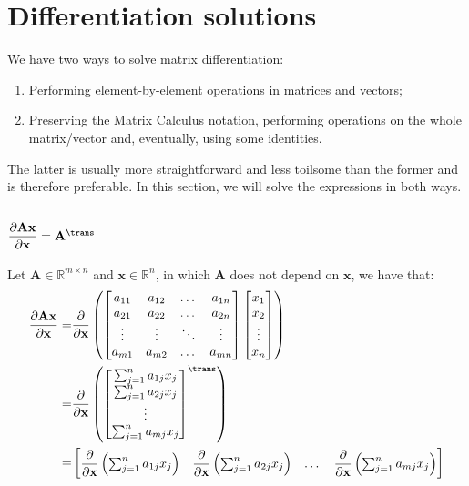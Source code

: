 \section{Differentiation solutions}\label{sec:diff}
We have two ways to solve matrix differentiation:
\begin{enumerate}
    \item Performing element-by-element operations in matrices and vectors;
    \item Preserving the Matrix Calculus notation, performing operations on the whole matrix/vector and, eventually, using some identities.
\end{enumerate}
The latter is usually more straightforward and less toilsome than the former and is therefore preferable. In this section, we will solve the expressions in both ways.

\subsection{\(\dfrac{\partial \mathbf{A} \mathbf{x}}{\partial \mathbf{x}} = \mathbf{A}^\trans\)}

Let \(\mathbf{A}\in \mathbb{R}^{m\times n}\) and \(\mathbf{x} \in \mathbb{R}^{n}\), in which \(\mathbf{A}\) does not depend on \(\mathbf{x}\), we have that:
\begin{align}
    \dfrac{\partial \mathbf{A} \mathbf{x}}{\partial \mathbf{x}} = & \dfrac{\partial}{\partial \mathbf{x}} \left(
        \begin{bmatrix}
            a_{11} & a_{12} & \dots & a_{1n} \\
            a_{21} & a_{22} & \dots & a_{2n} \\
            \vdots & \vdots & \ddots & \vdots \\
            a_{m1} & a_{m2} & \dots & a_{mn} \\
        \end{bmatrix} \begin{bmatrix}
            x_{1} \\ x_{2} \\ \vdots \\ x_{n}
        \end{bmatrix} \right)  \\
    = & \dfrac{\partial}{\partial \mathbf{x}} \left(\begin{bmatrix} 
        \sum_{j = 1}^n a_{1j}x_j \\
        \sum_{j = 1}^n a_{2j}x_j \\
        \vdots \\
        \sum_{j = 1}^n a_{mj}x_j
    \end{bmatrix}^\trans \right)  \\
    = & \begin{bmatrix}
        \dfrac{\partial}{\partial \mathbf{x}}\left(\sum_{j = 1}^n {a_{1j}x_j}\right) & \dfrac{\partial}{\partial \mathbf{x}}\left(\sum_{j = 1}^n {a_{2j}x_j}\right) & \dots & \dfrac{\partial}{\partial \mathbf{x}}\left(\sum_{j = 1}^n {a_{mj}x_j}\right)
    \end{bmatrix}
\end{align}

